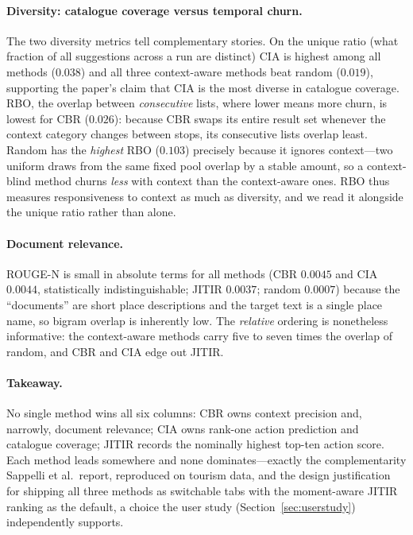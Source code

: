 \documentclass[acmlarge]{acmart}
\begin{document}
\paragraph{Diversity: catalogue coverage versus temporal churn.}
The two diversity metrics tell complementary stories. On the unique ratio
(what fraction of all suggestions across a run are distinct) CIA is highest
among all methods ($0.038$) and all three context-aware methods beat random
($0.019$), supporting the paper's claim that CIA is the most diverse in
catalogue coverage. RBO, the overlap between \emph{consecutive} lists,
where lower means more churn, is lowest for CBR ($0.026$): because CBR
swaps its entire result set whenever the context category changes between
stops, its consecutive lists overlap least. Random has the \emph{highest}
RBO ($0.103$) precisely because it ignores context---two uniform draws from
the same fixed pool overlap by a stable amount, so a context-blind method
churns \emph{less} with context than the context-aware ones. RBO thus
measures responsiveness to context as much as diversity, and we read it
alongside the unique ratio rather than alone.

\paragraph{Document relevance.}
ROUGE-N is small in absolute terms for all methods (CBR $0.0045$ and CIA
$0.0044$, statistically indistinguishable; JITIR $0.0037$; random
$0.0007$) because the ``documents''
are short place descriptions and the target text is a single place name, so
bigram overlap is inherently low. The \emph{relative} ordering is
nonetheless informative: the context-aware methods carry five to seven
times the overlap of random, and CBR and CIA edge out JITIR.

\paragraph{Takeaway.}
No single method wins all six columns: CBR owns context precision and,
narrowly, document relevance; CIA owns rank-one action prediction and
catalogue coverage; JITIR records the nominally highest top-ten action
score. Each method leads somewhere and none dominates---exactly the
complementarity Sappelli et al.\ report, reproduced on tourism data, and
the design justification for shipping all three methods as switchable
tabs with the moment-aware JITIR ranking as the default, a choice the
user study (Section~\ref{sec:userstudy}) independently supports.
\end{document}
